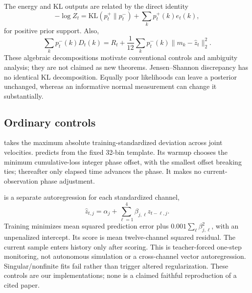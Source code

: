 The energy and KL outputs are related by the direct identity
\begin{equation}
 -\log Z_t=\mathrm{KL}(p^+_t\|p^-_t)+\sum_k p^+_t(k)e_t(k),
 \label{eq:energyidentity}
\end{equation}
for positive prior support. Also,
\begin{equation}
 \sum_k p^-_t(k)D_t(k)=R_t+
 \frac1{12}\sum_k p^-_t(k)\|m_k-\widehat z_t\|_2^2.
 \label{eq:mixtureidentity}
\end{equation}
These algebraic decompositions motivate conventional controls and ambiguity analysis; they are not claimed as new theorems. Jensen--Shannon discrepancy has no identical KL decomposition. Equally poor likelihoods can leave a posterior unchanged, whereas an informative normal measurement can change it substantially.

\subsection{Ordinary controls}
 takes the maximum absolute training-standardized deviation across joint velocities.  predicts from the fixed 32-bin template. Its warmup chooses the minimum cumulative-loss integer phase offset, with the smallest offset breaking ties; thereafter only elapsed time advances the phase. It makes no current-observation phase adjustment.

 is a separate autoregression for each standardized channel,
\begin{equation}
 \widehat z_{t,j}=\alpha_j+\sum_{\ell=1}^{4}\beta_{j,\ell}z_{t-\ell,j}.
 \label{eq:ar}
\end{equation}
Training minimizes mean squared prediction error plus $0.001\sum_\ell\beta_{j,\ell}^2$, with an unpenalized intercept. Its score is mean twelve-channel squared residual. The current sample enters history only after scoring. This is teacher-forced one-step monitoring, not autonomous simulation or a cross-channel vector autoregression. Singular/nonfinite fits fail rather than trigger altered regularization. These controls are our implementations; none is a claimed faithful reproduction of a cited paper.
